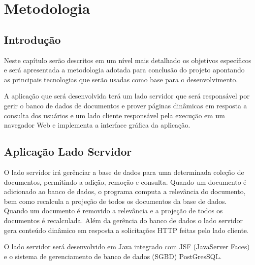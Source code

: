 \chapter{Metodologia}
\label{sec-projeto}

\section{Introdução}
\label{Intro-Metodologia}

Neste capítulo serão descritos em um nível mais detalhado os objetivos específicos e será apresentada a metodologia adotada para conclusão do projeto apontando as principais tecnologias que serão usadas como base para o desenvolvimento.

A aplicação que será desenvolvida terá um lado servidor que será responsável por gerir o banco de dados de documentos e prover páginas dinâmicas em resposta a consulta dos usuários e um lado cliente responsável pela execução em um navegador Web e implementa a interface gráfica da aplicação.



\section{Aplicação Lado Servidor}

O lado servidor irá gerênciar a base de dados para uma determinada coleção de documentos, permitindo a adição, remoção e consulta. Quando um documento é adicionado ao banco de dados, o programa computa a relevância do documento, bem como recalcula a projeção de todos os documentos da base de dados. Quando um documento é removido a relevância e a projeção de todos os documentos é recalculada. Além da gerência do banco de dados o lado servidor gera conteúdo dinâmico em resposta a solicitações HTTP feitas pelo lado cliente.

O lado servidor será desenvolvido em Java integrado com JSF (JavaServer Faces) e o sistema de gerenciamento de banco de dados (SGBD)  PostGresSQL.

